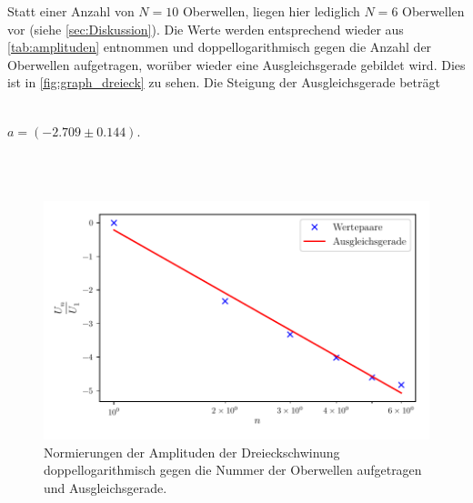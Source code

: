 Statt einer Anzahl von $N = 10$ Oberwellen, liegen hier lediglich $N = 6$ Oberwellen vor (siehe \autoref{sec:Diskussion}).
Die Werte werden entsprechend wieder aus \autoref{tab:amplituden} entnommen und doppellogarithmisch gegen die Anzahl der 
Oberwellen aufgetragen, worüber wieder eine Ausgleichsgerade gebildet wird. Dies ist in \autoref{fig:graph_dreieck} zu sehen.
Die Steigung der Ausgleichsgerade beträgt 
\\ \\
\centerline{$a = ( -2.709 \pm 0.144 )$.}
\\ \\
\begin{figure}
  \centering
  \includegraphics{build/dreieck.pdf}
  \caption{Normierungen der Amplituden der Dreieckschwinung doppellogarithmisch gegen die Nummer der Oberwellen aufgetragen und Ausgleichsgerade.}
  \label{fig:graph_dreieck}
\end{figure}
\newpage
